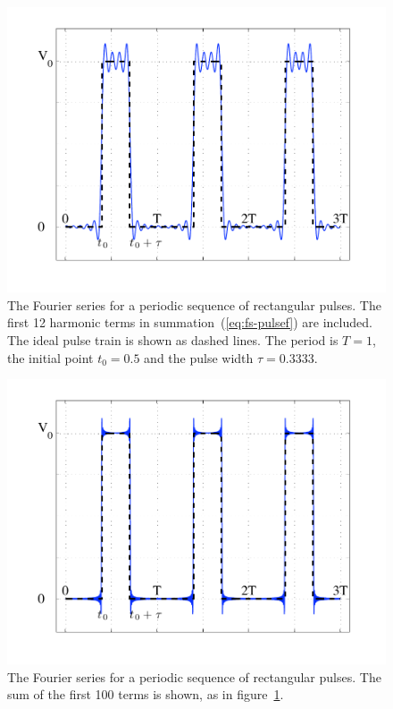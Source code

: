 \begin{figure}
\centerline{\includegraphics[width=5in]{ch-physical/fs_pulsef12}}
\caption[First 12 terms in the Fourier series for a periodic sequence
of rectangular pulses]{The Fourier series for a periodic sequence of
rectangular pulses. The first 12 harmonic terms in
summation~(\protect\ref{eq:fs-pulsef}) are included. The ideal pulse
train is shown as dashed lines. The period is $T=1$, the initial point
$t_0=0.5$ and the pulse width $\tau=0.3333$.
\label{fig:fs-pulsef}}
\end{figure}

\begin{figure}
\centerline{\includegraphics[width=5in]{ch-physical/fs_pulsef100}}
\caption[First 100 terms in the Fourier series for a periodic sequence
of rectangular pulses]{The Fourier series for a periodic sequence of
rectangular pulses. The sum of the first 100 terms is shown, as in
figure~\protect\ref{fig:fs-pulsef}.
\label{fig:fs-pulsef2}}
\end{figure}

